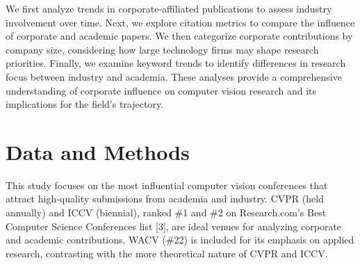 \documentclass{article}
\begin{document}
We first analyze trends in corporate-affiliated publications to assess industry involvement over time. Next, we explore citation metrics to compare the influence of corporate and academic papers. We then categorize corporate contributions by company size, considering how large technology firms may shape research priorities. Finally, we examine keyword trends to identify differences in research focus between industry and academia. These analyses provide a comprehensive understanding of corporate influence on computer vision research and its implications for the field’s trajectory.
\vspace{-7pt}
\section{Data and Methods}
\vspace{-7pt}
This study focuses on the most influential computer vision conferences that attract high-quality submissions from academia and industry. CVPR (held annually) and ICCV (biennial), ranked \#1 and \#2 on Research.com’s Best Computer Science Conferences list [3], are ideal venues for analyzing corporate and academic contributions. WACV (\#22) is included for its emphasis on applied research, contrasting with the more theoretical nature of CVPR and ICCV.
\end{document}
